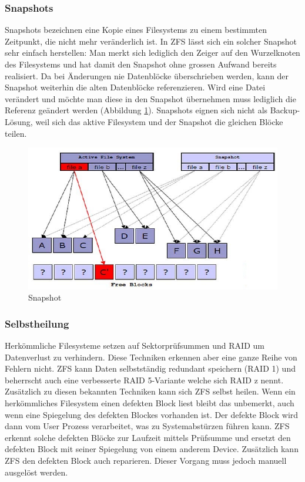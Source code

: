 \subsubsection{Snapshots}

Snapshots bezeichnen eine Kopie eines Filesystems zu einem bestimmten Zeitpunkt, die nicht mehr veränderlich ist. In ZFS lässt sich ein solcher Snapshot sehr einfach herstellen: Man merkt sich lediglich den Zeiger auf den Wurzelknoten des Filesystems und hat damit den Snapshot ohne grossen Aufwand bereits realisiert. Da bei Änderungen nie Datenblöcke überschrieben werden, kann der Snapshot weiterhin die alten Datenblöcke referenzieren. Wird eine Datei verändert und möchte man diese in den Snapshot übernehmen muss lediglich die Referenz geändert werden (Abbildung \ref{fig:snapshot}). Snapshots eignen sich nicht als Backup-Lösung, weil sich das aktive Filesystem und der Snapshot die gleichen Blöcke teilen.

\begin{figure}[h!]
\centering
\includegraphics[width=0.7\linewidth]{fig/snapshot}
\caption{Snapshot}
\label{fig:snapshot}
\end{figure}

\subsubsection{Selbstheilung}

Herkömmliche Filesysteme setzen auf Sektorprüfsummen und RAID um Datenverlust zu verhindern. Diese Techniken erkennen aber eine ganze Reihe von Fehlern nicht. ZFS kann Daten selbstständig redundant speichern (RAID 1) und beherrscht auch eine verbesserte RAID 5-Variante welche sich RAID z nennt. Zusätzlich zu diesen bekannten Techniken kann sich ZFS selbst heilen. Wenn ein herkömmliches Filesystem einen defekten Block liest bleibt das unbemerkt, auch wenn eine Spiegelung des defekten Blockes vorhanden ist. Der defekte Block wird dann vom User Prozess verarbeitet, was zu Systemabstürzen führen kann. ZFS erkennt solche defekten Blöcke zur Laufzeit mittels Prüfsumme und ersetzt den defekten Block mit seiner Spiegelung von einem anderem Device. Zusätzlich kann ZFS den defekten Block auch reparieren. Dieser Vorgang muss jedoch manuell ausgelöst werden.

